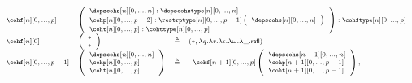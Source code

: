 \documentclass{msc}
\newcommand{\unitpoint}{\ensuremath{\ast}}
\newcommand{\defeq}{\ensuremath{\triangleq}}
\newcommand{\refl}{\ensuremath{\mathsf{refl}}}
\begin{document}
\begin{equation*}
  \fontsize{7.2}{9}\selectfont
  \begin{array}{llcl}
    \cohf[n][0,...,p]                                  &
    \multicolumn{3}{l}{
      \left(\begin{array}{l}
                \depscohs[n][0,...,n]:\depscohstype[n][0,...,n] \\
                \cohp[n][0,...,p-2]:\restrptype[n][0,...,p-1]
                \left(\begin{array}{l}
                    \depscohs[n][0,...,n] \\
                  \end{array}\right)                     \\
                \coht[n][0,...,p]:\cohttype[n][0,...,p]
              \end{array}\right) : \cohftype[n][0,...,p]
    }                                                                                                                                                 \\
    \cohf[n][0]                                        &
    \left(\begin{array}{l}
              \unitpoint \\
              \unitpoint \\
            \end{array}\right)                             & \defeq & (\unitpoint,\lambda q.\lambda r. \lambda\epsilon. \lambda\omega.\lambda \_.\refl) \\
    \cohf[n][0,...,p+1]                                &
    \left(\begin{array}{l}
              \depscohs[n][0,...,n] \\
              \cohp[n][0,...,p]     \\
              \coht[n][0,...,p]     \\
            \end{array}\right)                           & \defeq &
    \begin{array}{l}
      \cohf[n+1][0,...,p]
      \left(\begin{array}{l}
                \depscohs[n+1][0,...,n] \\
                \cohp[n+1][0,...,p-1]   \\
                \coht[n+1][0,...,p-1]   \\
              \end{array}\right),                                                                                 \\

\end{array}
\end{array}
\end{equation*}
\end{document}
